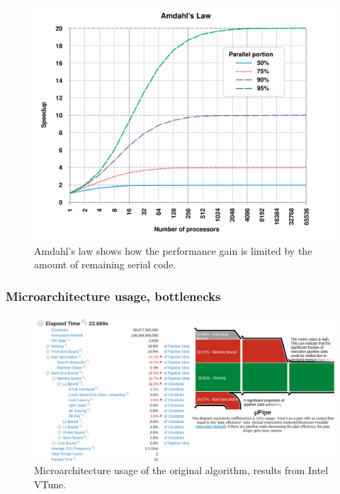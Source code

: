 \documentclass[12pt]{article}
\begin{document}
\begin{figure}[H]
	\begin{center}
		\includegraphics[width=\textwidth]{amdahls_law}
	\end{center}
	\caption{Amdahl's law shows how the performance gain is limited by the amount of remaining serial code.}
	\label{fig_amdahls_law}
\end{figure}


\subsubsection{Microarchitecture usage, bottlenecks}

\begin{figure}[H]
	\begin{center}
		\includegraphics[width=\textwidth]{velout_uarch_overall_orig}
	\end{center}
	\caption{Microarchitecture usage of the original algorithm, results from Intel VTune.}
	\label{fig_velout_uarch_overall_orig}
\end{figure}
\end{document}
